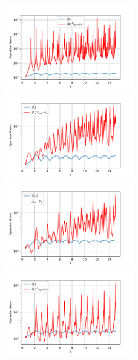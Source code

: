 \documentclass[12pt,journal,compsoc, onecolumn]{IEEEtran}
\begin{document}
\begin{figure}
    \includegraphics[width=0.5\textwidth]{InvertedMinimumSingularValuec_i1,0c_o3,0N_30eta0start_0,5end_15shiftFirstValue_Trueremove_Falseindexrange_-18,0-0,0_y_0_0,6748762480507995.pdf}
    \includegraphics[width=0.5\textwidth]{InvertedMinimumSingularValuec_i1,0c_o3,0N_30eta0,5start_0,5end_15shiftFirstValue_Trueremove_Falseindexrange_-20,0-0,0_y_0_0,6853549487874291.pdf}  \\
    \includegraphics[width=0.5\textwidth]
    {InvertedMinimumSingularValuec_i1,0c_o3,0N_30eta1,0plotRangeStart_0,5plotRangeEnd_15indexrange_-20,0-0,0_y_0_0,7115197817684848.pdf} 
    \includegraphics[width=0.5\textwidth]{InvertedMinimumSingularValuec_i1,0c_o3,0N_30eta5,0sart_0,5end_15shiftFirstValue_Trueremove_Falseindexrange_-19,0-0,0_y_0_0,8594171126139554.pdf}  \\

\end{figure}
\end{document}
